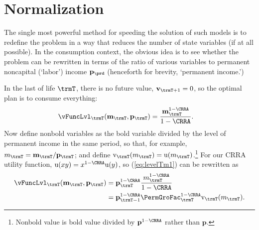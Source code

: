 \documentclass[titlepage, headings=optiontotocandhead]{econtex}
\begin{document}
\section{Normalization}\label{sec:normalization}

The single most powerful method for speeding the solution of such models is to redefine the problem in a way that reduces the number of state variables (if at all possible).  In the consumption context, the obvious idea is to see whether the problem can be rewritten in terms of the ratio of various variables to permanent noncapital (`labor') income $\mathbf{p}_{\prd}$ (henceforth for brevity, `permanent income.')

In the last {\interval} of life $\trmT$, there is no future value, $\mathbf{v}_{\trmT+1} = 0$, so the optimal plan is to consume everything:
\begin{equation}\begin{gathered}\begin{aligned}
      \vFuncLvl_{\trmT}(\mathbf{m}_{\trmT},\mathbf{p}_{\trmT})  & = \frac{\mathbf{m}_{\trmT}^{1-\CRRA}}{1-\CRRA}. \label{eq:levelTm1}
    \end{aligned}\end{gathered}\end{equation}
Now define nonbold variables as the bold variable divided by the level of permanent income in the same period, so that, for example, $m_{\trmT}=\mathbf{m}_{\trmT}/\mathbf{p}_{\trmT}$; and define $\mathrm{v}_{\trmT}(m_{\trmT}) = \mathrm{u}(m_{\trmT})$.\footnote{Nonbold value is bold value divided by $\mathbf{p}^{1-\CRRA}$ rather than $\mathbf{p}$.}  For our CRRA utility function, $\mathrm{u}(xy)=x^{1-\CRRA}\mathrm{u}(y)$, so (\ref{eq:levelTm1}) can be rewritten as
\begin{equation}\begin{gathered}\begin{aligned}
      \vFuncLvl_{\trmT}(\mathbf{m}_{\trmT},\mathbf{p}_{\trmT}) & = \mathbf{p}_{\trmT}^{1-\CRRA}\frac{m_{\trmT}^{1-\CRRA}}{1-\CRRA}                       \\
                                                &= \mathbf{p}_{\trmT-1}^{1-\CRRA}\PermGroFac_{\trmT}^{1-\CRRA}\mathrm{v}_{\trmT}(m_{\trmT}). \label{eq:vT}
    \end{aligned}\end{gathered}\end{equation}
\end{document}
